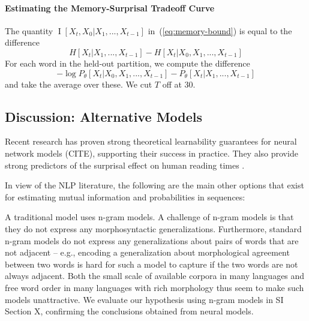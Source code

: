 \documentclass[11pt,letterpaper]{article}
\begin{document}



\paragraph{Estimating the Memory-Surprisal Tradeoff Curve}



The quantity $\operatorname{I}[X_t, X_0 | X_1, ..., X_{t-1}]$ in~(\ref{eq:memory-bound}) is equal to the difference 
\begin{equation}
H[X_t|X_1, ..., X_{t-1}] - H[X_t|X_0, X_1, ..., X_{t-1}]
\end{equation}
For each word in the held-out partition, we compute the difference
\begin{equation}
	-\log P_\theta[X_t | X_0, X_1, ..., X_{t-1}] - P_\theta[X_t | X_1, ..., X_{t-1}]
\end{equation}
and take the average over these.
We cut $T$ off at 30.



\subsection{Discussion: Alternative Models}
Recent research has proven strong theoretical learnability guarantees for neural network models (CITE), supporting their success in practice.
They also provide strong predictors of the surprisal effect on human reading times \citep{frank-insensitivity-2011, goodkind-predictive-2018}.

In view of the NLP literature, the following are the main other options that exist for estimating mutual information and probabilities in sequences:

A traditional model uses n-gram models. A challenge of n-gram models is that they do not express any morphosyntactic generalizations. Furthermore, standard n-gram models do not express any generalizations about pairs of words that are not adjacent -- e.g., encoding a generalization about morphological agreement between two words is hard for such a model to capture if the two words are not always adjacent. Both the small scale of available corpora in many languages and free word order in many languages with rich morphology thus seem to make such models unattractive.
We evaluate our hypothesis using n-gram models in SI Section X, confirming the conclusions obtained from neural models.
\end{document}
